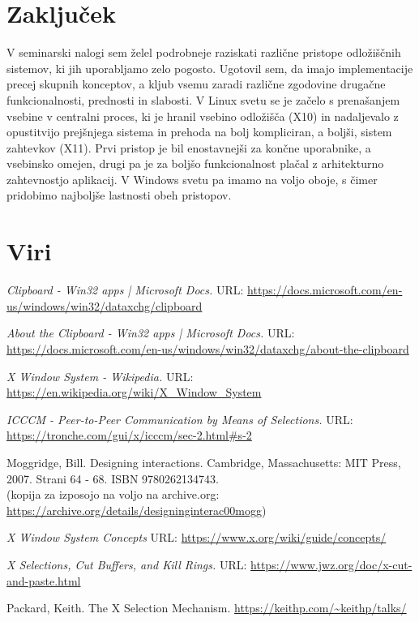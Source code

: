 \documentclass[12pt, A4]{article}
\begin{document}
	\section{Zaključek}
	V seminarski nalogi sem želel podrobneje raziskati različne pristope odložiščnih sistemov, ki jih uporabljamo zelo pogosto. Ugotovil sem, da imajo implementacije precej skupnih konceptov, a kljub vsemu zaradi različne zgodovine drugačne funkcionalnosti, prednosti in slabosti. V Linux svetu se je začelo s prenašanjem vsebine v centralni proces, ki je hranil vsebino odložišča (X10) in nadaljevalo z opustitvijo prejšnjega sistema in prehoda na bolj kompliciran, a boljši, sistem zahtevkov (X11). Prvi pristop je bil enostavnejši za končne uporabnike, a vsebinsko omejen, drugi pa je za boljšo funkcionalnost plačal z arhitekturno zahtevnostjo aplikacij. V Windows svetu pa imamo na voljo oboje, s čimer pridobimo najboljše lastnosti obeh pristopov.
	
	
	\pagebreak
	\section{Viri}
	\begingroup
	\renewcommand{\section}[2]{}%
	\begin{thebibliography}{10}
		\textit{Clipboard - Win32 apps | Microsoft Docs.}
		URL: \url{https://docs.microsoft.com/en-us/windows/win32/dataxchg/clipboard}
		
		\textit{About the Clipboard - Win32 apps | Microsoft Docs.}
		URL: \url{https://docs.microsoft.com/en-us/windows/win32/dataxchg/about-the-clipboard}
		
		\textit{X Window System - Wikipedia.}
		URL: \url{https://en.wikipedia.org/wiki/X_Window_System}
		
		\textit{ICCCM - Peer-to-Peer Communication by Means of Selections.}
		URL: \url{https://tronche.com/gui/x/icccm/sec-2.html#s-2}
		
		Moggridge, Bill. Designing interactions. Cambridge, Massachusetts: MIT Press, 2007. Strani 64 - 68. ISBN 9780262134743. \\
		(kopija za izposojo na voljo na archive.org: \url{https://archive.org/details/designinginterac00mogg})
		
		\textit{X Window System Concepts}
		URL: \url{https://www.x.org/wiki/guide/concepts/}
		
		\textit{X Selections, Cut Buffers, and Kill Rings.}
		URL: \url{https://www.jwz.org/doc/x-cut-and-paste.html}
		
		Packard, Keith. The X Selection Mechanism. \url{https://keithp.com/~keithp/talks/}
	\end{thebibliography}
	\endgroup
	
\end{document}
